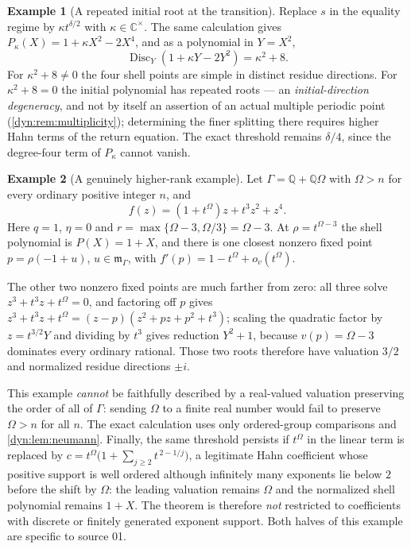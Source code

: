 \documentclass[11pt,letterpaper]{article}
\theoremstyle{definition}
\newtheorem{example}[example]{Example}
\theoremstyle{remark}
\newcommand{\C}{\mathbb C}
\newcommand{\Q}{\mathbb Q}
\newcommand{\m}{\mathfrak m}
\newcommand{\Disc}{\operatorname{Disc}}
\numberwithin{equation}{section}
\begin{document}
\begin{example}[A repeated initial root at the transition]\label{dyn:ex:kappa}
Replace $s$ in the equality regime by $\kappa t^{\delta/2}$ with
$\kappa\in\C^{\times}$. The same calculation gives
$P_\kappa(X)=1+\kappa X^{2}-2X^{4}$, and as a polynomial in $Y=X^{2}$,
\[
 \Disc_Y(1+\kappa Y-2Y^{2})=\kappa^{2}+8 .
\]
For $\kappa^{2}+8\ne0$ the four shell points are simple in distinct residue
directions. For $\kappa^{2}+8=0$ the initial polynomial has repeated roots
--- an \emph{initial-direction degeneracy}, and not by itself an assertion
of an actual multiple periodic point (\cref{dyn:rem:multiplicity});
determining the finer splitting there requires higher Hahn terms of the
return equation. The exact threshold remains $\delta/4$, since the
degree-four term of $P_\kappa$ cannot vanish.
\end{example}

\begin{example}[A genuinely higher-rank example]\label{dyn:ex:rank2}
Let $\Gamma=\Q+\Q\Omega$ with $\Omega>n$ for every ordinary positive
integer $n$, and
\begin{equation}\label{dyn:eq:rank2}
 f(z)=(1+t^{\Omega})z+t^{3}z^{2}+z^{4}.
\end{equation}
Here $q=1$, $\eta=0$ and $r=\max\{\Omega-3,\Omega/3\}=\Omega-3$. At
$\rho=t^{\Omega-3}$ the shell polynomial is $P(X)=1+X$, and there is one
closest nonzero fixed point $p=\rho(-1+u)$, $u\in\m_\Gamma$, with
$f'(p)=1-t^{\Omega}+o_v(t^{\Omega})$.

The other two nonzero fixed points are much farther from zero: all three
solve $z^{3}+t^{3}z+t^{\Omega}=0$, and factoring off $p$ gives
$z^{3}+t^{3}z+t^{\Omega}=(z-p)(z^{2}+pz+p^{2}+t^{3})$; scaling the
quadratic factor by $z=t^{3/2}Y$ and dividing by $t^{3}$ gives reduction
$Y^{2}+1$, because $v(p)=\Omega-3$ dominates every ordinary rational.
Those two roots therefore have valuation $3/2$ and normalized residue
directions $\pm i$.

This example \emph{cannot} be faithfully described by a real-valued
valuation preserving the order of all of $\Gamma$: sending $\Omega$ to a
finite real number would fail to preserve $\Omega>n$ for all $n$. The exact
calculation uses only ordered-group comparisons and
\cref{dyn:lem:neumann}. Finally, the same threshold persists if
$t^{\Omega}$ in the linear term is replaced by
$c=t^{\Omega}\bigl(1+\sum_{j\ge2}t^{\,2-1/j}\bigr)$, a legitimate Hahn
coefficient whose positive support is well ordered although infinitely many
exponents lie below $2$ before the shift by $\Omega$: the leading valuation
remains $\Omega$ and the normalized shell polynomial remains $1+X$. The
theorem is therefore \emph{not} restricted to coefficients with discrete or
finitely generated exponent support. Both halves of this example are
specific to source 01.
\end{example}
\end{document}
